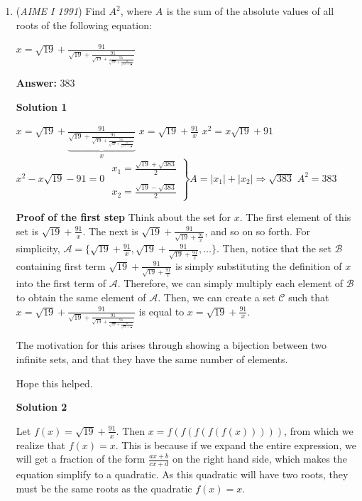 \begin{enumerate}
	\item (\textit{AIME I 1991}) Find $A^2_{}$, where $A^{}_{}$ is the sum of the absolute values of all roots of the following equation:


 $x = \sqrt{19} + \frac{91}{{\sqrt{19}+\frac{91}{{\sqrt{19}+\frac{91}{{\sqrt{19}+\frac{91}{{\sqrt{19}+\frac{91}{x}}}}}}}}}$

 \textbf{Answer: }383



\textbf{Solution 1}

$x=\sqrt{19}+\underbrace{\frac{91}{\sqrt{19}+\frac{91}{\sqrt{19}+\frac{91}{\sqrt{19}+\frac{91}{\sqrt{19}+\frac{91}{x}}}}}}_{x}$
$x=\sqrt{19}+\frac{91}{x}$
$x^2=x\sqrt{19}+91$
$x^2-x\sqrt{19}-91 = 0$
$\left.\begin{array}{l}x_1=\frac{\sqrt{19}+\sqrt{383}}{2}\\\\x_2=\frac{\sqrt{19}-\sqrt{383}}{2}\end{array}\right\}A=|x_1|+|x_2|\Rightarrow\sqrt{383}$
$A^2=\boxed{383}$

 \textbf{Proof of the first step} Think about the set for $x$. The first element of this set is $\sqrt{19}+\frac{91}{x}$. The next is $\sqrt{19}+\frac{91}{\sqrt{19}+\frac{91}{x}}$, and so on so forth. For simplicity, $\mathcal{A} = \{\sqrt{19}+\frac{91}{x},\sqrt{19}+\frac{91}{\sqrt{19}+\frac{91}{x}}, \dots \}$. Then, notice that the set $\mathcal{B}$ containing first term $\sqrt{19}+\frac{91}{\sqrt{19}+\frac{91}{x}}$ is simply substituting the definition of $x$ into the first term of $\mathcal{A}$. Therefore, we can simply multiply each element of $\mathcal{B}$ to obtain the same element of $\mathcal{A}$. Then, we can create a set $\mathcal{C}$ such that $x=\sqrt{19}+\frac{91}{\sqrt{19}+\frac{91}{\sqrt{19}+\frac{91}{\sqrt{19}+\frac{91}{\sqrt{19}+\frac{91}{x}}}}}$ is equal to $x=\sqrt{19}+\frac{91}{x}$.

 The motivation for this arises through showing a bijection between two infinite sets, and that they have the same number of elements.

 Hope this helped.

 



\textbf{Solution 2}

Let $f(x) = \sqrt{19} + \frac{91}{x}$. Then $x = f(f(f(f(f(x)))))$, from which we realize that $f(x) = x$. This is because if we expand the entire expression, we will get a fraction of the form $\frac{ax + b}{cx + d}$ on the right hand side, which makes the equation simplify to a quadratic. As this quadratic will have two roots, they must be the same roots as the quadratic $f(x)=x$.


\end{enumerate}

